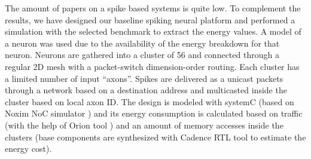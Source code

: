 \documentclass[conference, compsoc]{IEEEtran}
\begin{document}
The amount of papers on a spike based systems is quite low. To complement the results, we have designed our baseline spiking neural platform and performed a simulation with the selected benchmark to extract the energy values. A model of a neuron \cite{Phong} was used due to the availability of the energy breakdown for that neuron. Neurons are gathered into a cluster of 56 and connected through a regular 2D mesh with a packet-switch dimension-order routing. Each cluster has a limited number of input “axons”. Spikes are delivered as a unicast packets through a network based on a destination address and multicasted inside the cluster based on local axon ID. The design is modeled with systemC (based on Noxim NoC simulator \cite{NOXIM}) and its energy consumption is calculated based on traffic (with the help of Orion tool \cite{Orion}) and an amount of memory accesses inside the clusters (base components are synthesized with Cadence RTL tool to estimate the energy cost).
\end{document}
